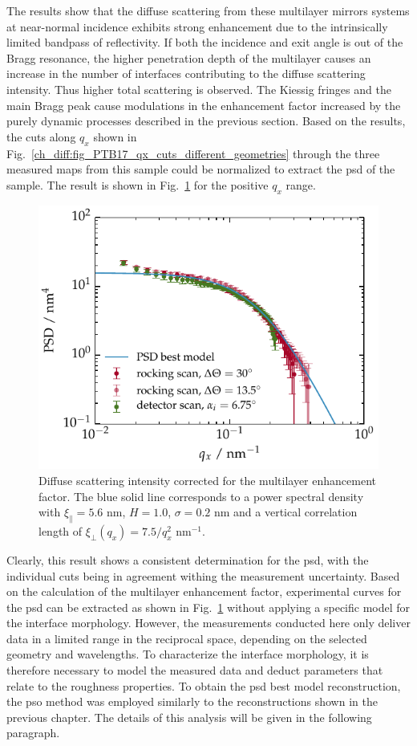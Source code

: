 The results show that the diffuse scattering from these multilayer mirrors systems at near-normal incidence exhibits strong enhancement due to the intrinsically limited bandpass of reflectivity. If both the incidence and exit angle is out of the Bragg resonance, the higher penetration depth of the multilayer causes an increase in the number of interfaces contributing to the diffuse scattering intensity. Thus higher total scattering is observed. The Kiessig fringes and the main Bragg peak cause modulations in the enhancement factor increased by the purely dynamic processes described in the previous section. Based on the results, the cuts along $q_x$ shown in Fig.~\ref{ch_diff:fig_PTB17_qx_cuts_different_geometries} through the three measured maps from this sample could be normalized to extract the \gls{psd} of the sample. The result is shown in Fig.~\ref{ch_diff:PTB17_PSD_for_all_geometries} for the positive $q_x$ range.
\begin{figure}[htbp]
	\includegraphics{img/PTB17_PSD_for_all_geometries} \caption{Diffuse scattering intensity corrected for the multilayer enhancement factor. The blue solid line corresponds to a power spectral density with $\xi_\parallel=5.6$ nm, $H=1.0$, $\sigma=0.2$ nm and a vertical correlation length of $\xi_\perp(q_x)=7.5/q_x^2$ nm$^{-1}$.} \label{ch_diff:PTB17_PSD_for_all_geometries} 
\end{figure}
Clearly, this result shows a consistent determination for the \gls{psd}, with the individual cuts being in agreement withing the measurement uncertainty. Based on the calculation of the multilayer enhancement factor, experimental curves for the \gls{psd} can be extracted as shown in Fig.~\ref{ch_diff:PTB17_PSD_for_all_geometries} without applying a specific model for the interface morphology. However, the measurements conducted here only deliver data in a limited range in the reciprocal space, depending on the selected geometry and wavelengths. To characterize the interface morphology, it is therefore necessary to model the measured data and deduct parameters that relate to the roughness properties. To obtain the \gls{psd} best model reconstruction, the \gls{pso} method was employed similarly to the reconstructions shown in the previous chapter. The details of this analysis will be given in the following paragraph.

